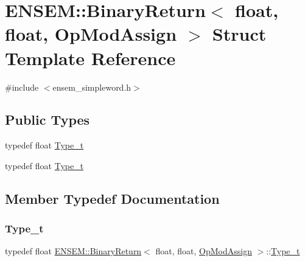 \hypertarget{structENSEM_1_1BinaryReturn_3_01float_00_01float_00_01OpModAssign_01_4}{}\section{E\+N\+S\+EM\+:\+:Binary\+Return$<$ float, float, Op\+Mod\+Assign $>$ Struct Template Reference}
\label{structENSEM_1_1BinaryReturn_3_01float_00_01float_00_01OpModAssign_01_4}


{\ttfamily \#include $<$ensem\+\_\+simpleword.\+h$>$}

\subsection*{Public Types}
\begin{DoxyCompactItemize}
\item 
typedef float \mbox{\hyperlink{structENSEM_1_1BinaryReturn_3_01float_00_01float_00_01OpModAssign_01_4_ae702556f8b6bcd0be5c8369133fc5c95}{Type\+\_\+t}}
\item 
typedef float \mbox{\hyperlink{structENSEM_1_1BinaryReturn_3_01float_00_01float_00_01OpModAssign_01_4_ae702556f8b6bcd0be5c8369133fc5c95}{Type\+\_\+t}}
\end{DoxyCompactItemize}


\subsection{Member Typedef Documentation}
\mbox{\label{structENSEM_1_1BinaryReturn_3_01float_00_01float_00_01OpModAssign_01_4_ae702556f8b6bcd0be5c8369133fc5c95}} 
\subsubsection{\texorpdfstring{Type\_t}{Type\_t}\hspace{0.1cm}{\footnotesize\ttfamily [1/2]}}
{\footnotesize\ttfamily typedef float \mbox{\hyperlink{structENSEM_1_1BinaryReturn}{E\+N\+S\+E\+M\+::\+Binary\+Return}}$<$ float, float, \mbox{\hyperlink{structENSEM_1_1OpModAssign}{Op\+Mod\+Assign}} $>$\+::\mbox{\hyperlink{structENSEM_1_1BinaryReturn_3_01float_00_01float_00_01OpModAssign_01_4_ae702556f8b6bcd0be5c8369133fc5c95}{Type\+\_\+t}}}

